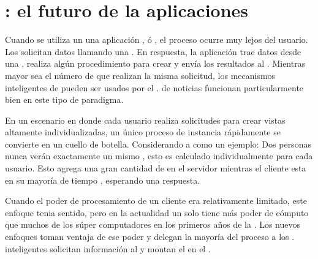 
\section{\isomorphicAS \javaScriptNAME : el futuro de la aplicaciones \webINT}\label{cap:estadoArte:section:web_app}
Cuando se utiliza un \backendAS \runningCPT una aplicación \javaNAME, \phpNAME ó \railsNAME, el proceso ocurre muy lejos del usuario. Los \clientsAS solicitan datos llamando una \uriNAME. En respuesta, la aplicación trae datos desde una \dataBaseDB, realiza algún procedimiento para crear \htmlNAME y envía los resultados al \clientAS. Mientras mayor sea el número de \clientsAS que realizan la misma solicitud, los mecanismos inteligentes de \caching pueden ser usados por el \serverAS. \sitesINT de noticias funcionan particularmente bien en este tipo de paradigma.

En un escenario en donde cada usuario realiza solicitudes para crear vistas altamente individualizadas, un único proceso de instancia rápidamente se convierte en un cuello de botella. Considerando a \facebook como un ejemplo: Dos personas nunca verán exactamente un mismo \facebookwall, esto es calculado individualmente para cada usuario. Esto agrega una gran cantidad de \stress en el servidor mientras el cliente esta en su mayoría de tiempo \idle, esperando una respuesta.

Cuando el poder de procesamiento de un cliente era relativamente limitado, este enfoque tenia sentido, pero en la actualidad un solo \smartphoneCPT tiene más poder de cómputo que muchos de los súper computadores en los primeros años de la \webINT. Los nuevos enfoques toman ventaja de ese poder y delegan la mayoría del proceso a los \clientsAS. \frontEndsAS inteligentes solicitan información al \serverAS y montan el \htmldomNAME en el \browserINT.

